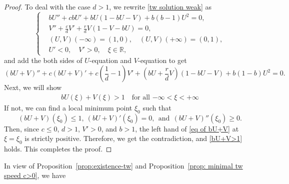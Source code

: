 \documentclass[11pt,a4paper]{article}
\newtheorem{claim}[theorem]{\textbf{Claim}}
\numberwithin{equation}{section}
\numberwithin{figure}{section}
\newcommand\bea{\begin{eqnarray}}
\newcommand\eea{\end{eqnarray}}
\begin{document}
\begin{proof}
To deal with the case $d> 1$, we rewrite \eqref{tw solution weak} as 
\begin{equation*}
        \left\{
            \begin{aligned}
                &bU''+cbU'+bU(1-bU-V)+b(b-1)U^2=0,\\
                &V''+\frac{c}{d}V'+\frac{r}{d}V(1-V-bU)=0,\\
                 &(U,V)(-\infty)=(1,0),\quad (U,V)(+\infty)=(0,1),\\
                &U'<0,\quad V'>0,\quad \xi\in\mathbb{R},
            \end{aligned}
            \right.
    \end{equation*}
and add the both sides of $U$-equation and $V$-equation to get
\begin{equation}\label{eq of bU+V}
(bU+V)''+c(bU+V)'+c(\frac{1}{d}-1)V'+(bU+\frac{r}{d}V)(1-bU-V)+b(1-b)U^2=0.
\end{equation}
Next, we will show 
\bea\label{bU+V>1}
bU(\xi)+V(\xi)> 1 \quad \mbox{for all $-\infty<\xi<+\infty$}
\eea
If not, we can find a local minimum point $\xi_0$ such that 
$$(bU+V)(\xi_0)\leq 1,\ (bU+V)'(\xi_0)=0,\ \ \text{and}\ \ (bU+V)''(\xi_0)\geq 0.$$
Then, since $c\leq 0$, $d> 1$, $V'>0$, and $b>1$, the left hand of \eqref{eq of bU+V} at $\xi=\xi_0$ is strictly positive. Therefore, we get the contradiction, and \eqref{bU+V>1} holds. This completes the proof.
\end{proof}


In view of Proposition~\ref{prop:existence-tw} 
and Proposition~\ref{prop: minimal tw speed c>0}, we have
\end{document}
